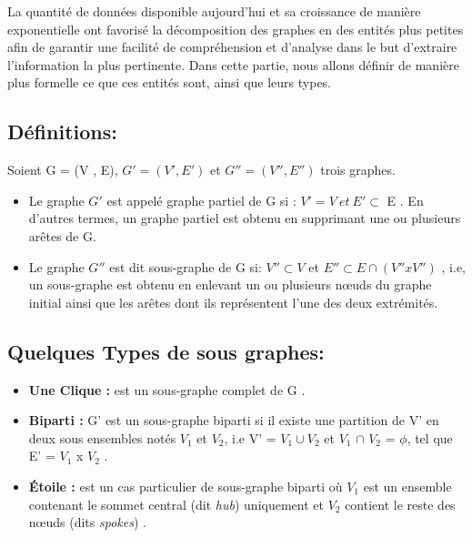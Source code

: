 
	La quantité de données disponible aujourd'hui et sa croissance de manière exponentielle ont favorisé la décomposition des graphes en des entités plus petites afin de garantir une facilité de compréhension et d'analyse dans le but d'extraire l'information la plus pertinente. Dans cette partie, nous allons définir de manière plus formelle ce que ces entités sont, ainsi que leurs types.
	
		
		
		
		\subsection{Définitions:}
		Soient G = (V , E), $G' = (V' , E')$ et $G'' = (V'' , E'')$ trois graphes.
		\begin{itemize}[label=$\circ$]
		
			\item Le graphe $G'$ est appelé graphe partiel de G si : $V' = V\ et\ E' \subset$ E \citep{DUT}. En d'autres termes, un graphe partiel est obtenu en supprimant une ou plusieurs arêtes de G.
				

			\item Le graphe $G''$ est dit sous-graphe de G si: $V''\subset V$ et 
			 $E''\subset E \cap (V'' x V'')$ \citep{bac}, i.e, un sous-graphe est obtenu en enlevant un ou plusieurs nœuds du graphe initial ainsi que les arêtes dont ils représentent l'une des deux extrémités.
			 
		\end{itemize}
		
		\subsection{Quelques Types de sous graphes:}
		
		\begin{itemize} [label = $\bullet$]
		
		
			\item \textbf{Une Clique :} est un sous-graphe complet de G \citep{bac}.
			
			\item \textbf{Biparti :} G' est un sous-graphe biparti si il existe une partition de V' en deux sous ensembles notés $V_{1}$ et $V_{2}$, i.e V' = $V_{1} \cup V_{2}$ et $V_{1}$ $\cap$ $V_{2}$ = $\phi$, tel que E' = $V_{1}$ x $V_{2}$ \citep{bac}.
			
			\item \textbf{Étoile :}
			 est un cas particulier de sous-graphe biparti où $V_{1}$ est un ensemble contenant le sommet central (dit \textit{hub}) uniquement et $V_{2}$ contient le reste des nœuds  (dits \textit{spokes})\citep{koutra2015summarizing} .
			 
		
			 
		\end{itemize}